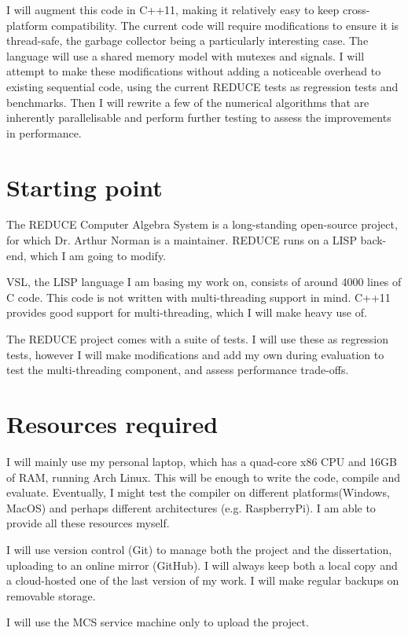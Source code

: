 \documentclass[12pt,a4paper,twoside]{article}
\begin{document}
I will augment this code in C++11,  making it
relatively easy to keep cross-platform compatibility. The current
code will require modifications to ensure it is thread-safe,
the garbage collector being a particularly interesting case.
The language will use a shared memory model with mutexes and signals.
I will attempt to make these modifications without adding a
noticeable overhead to existing sequential code, using the current
REDUCE tests as regression tests and benchmarks. Then I will rewrite
a few of the numerical algorithms that are inherently parallelisable
and perform further testing to assess the improvements in performance.

\section*{Starting point}

The REDUCE Computer Algebra System
is a long-standing open-source
project, for which Dr. Arthur Norman is a maintainer. REDUCE runs on a
LISP back-end, which I am going to modify.

VSL,  the LISP language I am basing my work on, consists of around 4000 lines of
C code. This code is not written with multi-threading support in mind. 
C++11 provides good support for multi-threading, which I will make heavy use of.

The REDUCE project comes with a suite of tests. I will use these as regression tests,
however I will make modifications and add my own during evaluation to test
the multi-threading component, and assess performance trade-offs.

\section*{Resources required}

I will mainly use my personal laptop, which has a quad-core x86 CPU
and 16GB of RAM, running Arch Linux. This will be enough to write the code, compile and evaluate.
Eventually, I might test the compiler on different platforms(Windows, MacOS) and perhaps
different architectures (e.g. RaspberryPi). I am able to provide all these resources myself.

I will use version control (Git) to manage both the project and the dissertation, uploading
to an online mirror (GitHub). I will always keep both a local copy and a cloud-hosted one of the
last version of my work. I will make regular backups on removable storage.

I will use the MCS service machine only to upload the project.
\end{document}
